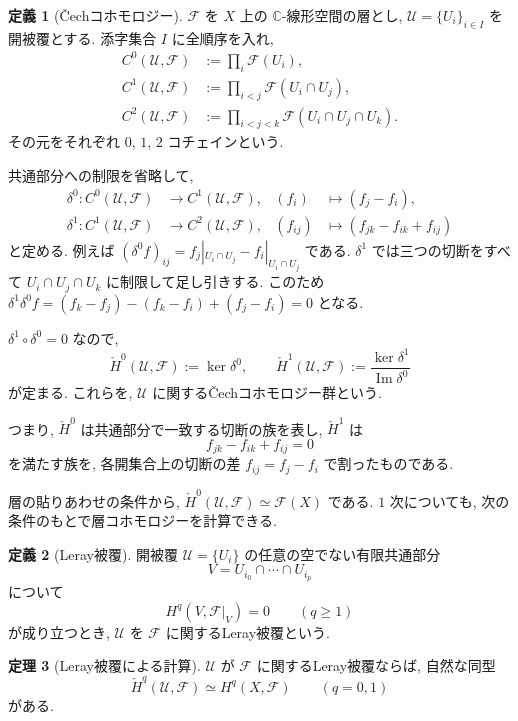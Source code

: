 \documentclass[dvipdfmx,a4paper,11pt]{article} %
\newcommand{\C}{\mathbb{C}}
\theoremstyle{definition}
\newtheorem{thm}{定理}[section]
\numberwithin{equation}{section}
\newtheorem{dfn}[thm]{定義}
\begin{document}
\begin{dfn}[\v{C}echコホモロジー]\label{O-M219}
$\mathcal F$ を $X$ 上の $\C$-線形空間の層とし, 
$\mathcal U=\{U_i\}_{i\in I}$ を開被覆とする.
添字集合 $I$ に全順序を入れ, 
\[
\begin{aligned}
C^0(\mathcal U,\mathcal F)&:=\prod_i\mathcal F(U_i),\\
C^1(\mathcal U,\mathcal F)&:=\prod_{i<j}\mathcal F(U_i\cap U_j),\\
C^2(\mathcal U,\mathcal F)&:=\prod_{i<j<k}\mathcal F(U_i\cap U_j\cap U_k).
\end{aligned}
\]
その元をそれぞれ $0$, $1$, $2$ コチェインという.


共通部分への制限を省略して, 
\[
\begin{aligned}
\delta^0:C^0(\mathcal U,\mathcal F)
&\longrightarrow C^1(\mathcal U,\mathcal F),
&
(f_i)&\longmapsto(f_j-f_i),\\
\delta^1:C^1(\mathcal U,\mathcal F)
&\longrightarrow C^2(\mathcal U,\mathcal F),
&
(f_{ij})&\longmapsto(f_{jk}-f_{ik}+f_{ij})
\end{aligned}
\]
と定める. 
例えば $(\delta^0 f)_{ij}=f_j|_{U_i\cap U_j}-f_i|_{U_i\cap U_j}$ である. $\delta^1$ では三つの切断をすべて $U_i\cap U_j\cap U_k$ に制限して足し引きする. このため $\delta^1\delta^0 f=(f_k-f_j)-(f_k-f_i)+(f_j-f_i)=0$ となる.

$\delta^1\circ\delta^0=0$ なので, 
\[
\check H^0(\mathcal U,\mathcal F):=\ker\delta^0,
\qquad
\check H^1(\mathcal U,\mathcal F)
:=\frac{\ker\delta^1}{\operatorname{Im}\delta^0}
\]
が定まる.
これらを, $\mathcal U$ に関する\v{C}echコホモロジー群という.

つまり, $\check H^0$ は共通部分で一致する切断の族を表し, 
$\check H^1$ は
\[
f_{jk}-f_{ik}+f_{ij}=0
\]
を満たす族を, 各開集合上の切断の差
$f_{ij}=f_j-f_i$ で割ったものである.
\end{dfn}

層の貼りあわせの条件から, 
$\check H^0(\mathcal U,\mathcal F)\simeq\mathcal F(X)$
である.
$1$ 次についても, 次の条件のもとで層コホモロジーを計算できる.

\begin{dfn}[Leray被覆]
開被覆 $\mathcal U=\{U_i\}$ の任意の空でない有限共通部分
\[
V=U_{i_0}\cap\cdots\cap U_{i_p}
\]
について
\[
H^q(V,\mathcal F|_V)=0\qquad(q\geq1)
\]
が成り立つとき, 
$\mathcal U$ を $\mathcal F$ に関するLeray被覆という.
\end{dfn}

\begin{thm}[Leray被覆による計算]\label{O-M229}
$\mathcal U$ が $\mathcal F$ に関するLeray被覆ならば, 
自然な同型
\[
\check H^q(\mathcal U,\mathcal F)
\simeq H^q(X,\mathcal F)
\qquad(q=0,1)
\]
がある.
\end{thm}
\end{document}
